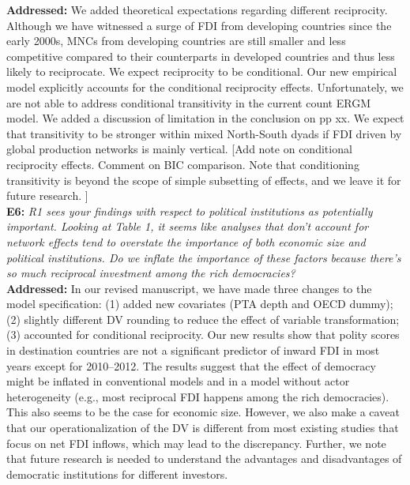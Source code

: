 \documentclass[a4paper,11pt]{texMemo}
\begin{document}
\noindent \textbf{Addressed:} We added theoretical expectations regarding different reciprocity. Although we have witnessed a surge of FDI from developing countries since the early 2000s, MNCs from developing countries are still smaller and less competitive compared to their counterparts in developed countries and thus less likely to reciprocate. We expect reciprocity to be conditional. Our new empirical model explicitly accounts for the conditional reciprocity effects. Unfortunately, we are not able to address conditional transitivity in the current count ERGM model. We added a discussion of limitation in the conclusion on pp xx. We expect that transitivity to be stronger within mixed North-South dyads if FDI driven by global production networks is mainly vertical. [Add note on conditional reciprocity effects. Comment on BIC comparison. Note that conditioning transitivity is beyond the scope of simple subsetting of effects, and we leave it for future research. ]\\

\noindent \textbf{E6:} \emph{R1 sees your findings with respect to political institutions as potentially important. Looking at Table 1, it seems like analyses that don't account for network effects tend to overstate the importance of both economic size and political institutions. Do we inflate the importance of these factors because there's so much reciprocal investment among the rich democracies?}\\

\noindent \textbf{Addressed:} In our revised manuscript, we have made three changes to the model specification: (1) added new covariates (PTA depth and OECD dummy); (2) slightly different DV rounding to reduce the effect of variable transformation; (3) accounted for conditional reciprocity. Our new results show that polity scores in destination countries are not a significant predictor of inward FDI in most years except for 2010--2012. The results suggest that the effect of democracy might be inflated in conventional models and in a model without actor heterogeneity (e.g., most reciprocal FDI happens among the rich democracies). This also seems to be the case for economic size. However, we also make a caveat that our operationalization of the DV is different from most existing studies that focus on net FDI inflows, which may lead to the discrepancy. Further, we note that future research is needed to understand the advantages and disadvantages of democratic institutions for different investors.\\
\end{document}
